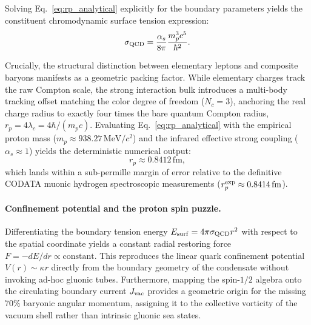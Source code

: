 \documentclass[
  reprint,
  aps,
  prd,
  twocolumn,
  superscriptaddress,
  nofootinbib,
  floatfix
]{revtex4-2}
\begin{document}
Solving Eq.~\eqref{eq:rp_analytical} explicitly for the 
boundary parameters yields the constituent chromodynamic 
surface tension expression:
\begin{equation}
\label{eq:sigma_qcd}
\sigma_{\rm QCD} = \frac{\alpha_s}{8\pi} \frac{m_p^3 c^5}{\hbar^2}.
\end{equation}

Crucially, the structural distinction between elementary leptons 
and composite baryons manifests as a geometric packing factor. 
While elementary charges track the raw Compton scale, the strong 
interaction bulk introduces a multi-body tracking offset matching the 
color degree of freedom ($N_c = 3$), anchoring the real charge radius 
to exactly four times the bare quantum Compton radius, $r_p = 
4\lambda_c = 4\hbar/(m_p c)$. Evaluating Eq.~\eqref{eq:rp_analytical} 
with the empirical proton mass ($m_p \approx 938.27\,\mathrm{MeV}/c^2$) 
and the infrared effective strong coupling ($\alpha_s \approx 1$) 
yields the deterministic numerical output:
\begin{equation}
\label{eq:rp_numerical}
r_p \approx 0.8412\,\mathrm{fm},
\end{equation}
which lands within a sub-permille margin of error relative to 
the definitive CODATA muonic hydrogen spectroscopic measurements 
($r_p^{\rm exp} \approx 0.8414\,\mathrm{fm}$).

\paragraph{Confinement potential and the proton spin puzzle.}
Differentiating the boundary tension energy $E_{\rm surf} = 
4\pi \sigma_{\rm QCD} r^2$ with respect to the spatial coordinate 
yields a constant radial restoring force $F = -dE/dr \propto 
\text{constant}$. This reproduces the linear quark confinement potential 
$V(r) \sim \kappa r$ directly from the boundary geometry of the 
condensate without invoking ad-hoc gluonic tubes. Furthermore, 
mapping the spin-$1/2$ algebra onto the circulating boundary current 
$J_{\rm vac}$ provides a geometric origin for the missing $70\%$ 
baryonic angular momentum, assigning it to the collective 
vorticity of the vacuum shell rather than intrinsic gluonic sea states.
\end{document}
